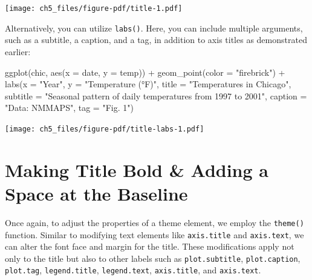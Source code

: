 \documentclass[
  letterpaper,
]{scrbook}
\newenvironment{Shaded}{\begin{snugshade}}{\end{snugshade}}
\newcommand{\AttributeTok}[1]{\textcolor[rgb]{0.40,0.45,0.13}{#1}}
\newcommand{\FunctionTok}[1]{\textcolor[rgb]{0.28,0.35,0.67}{#1}}
\newcommand{\NormalTok}[1]{\textcolor[rgb]{0.00,0.23,0.31}{#1}}
\newcommand{\SpecialCharTok}[1]{\textcolor[rgb]{0.37,0.37,0.37}{#1}}
\newcommand{\StringTok}[1]{\textcolor[rgb]{0.13,0.47,0.30}{#1}}
\begin{document}
\texttt{[image: ch5\_files/figure-pdf/title-1.pdf]}

Alternatively, you can utilize \texttt{labs()}. Here, you can include
multiple arguments, such as a subtitle, a caption, and a tag, in
addition to axis titles as demonstrated earlier:

\begin{Shaded}
\begin{Highlighting}[]
\FunctionTok{ggplot}\NormalTok{(chic, }\FunctionTok{aes}\NormalTok{(}\AttributeTok{x =}\NormalTok{ date, }\AttributeTok{y =}\NormalTok{ temp)) }\SpecialCharTok{+}
  \FunctionTok{geom\_point}\NormalTok{(}\AttributeTok{color =} \StringTok{"firebrick"}\NormalTok{) }\SpecialCharTok{+}
  \FunctionTok{labs}\NormalTok{(}\AttributeTok{x =} \StringTok{"Year"}\NormalTok{, }\AttributeTok{y =} \StringTok{"Temperature (°F)"}\NormalTok{,}
       \AttributeTok{title =} \StringTok{"Temperatures in Chicago"}\NormalTok{,}
       \AttributeTok{subtitle =} \StringTok{"Seasonal pattern of daily temperatures from 1997 to 2001"}\NormalTok{,}
       \AttributeTok{caption =} \StringTok{"Data: NMMAPS"}\NormalTok{,}
       \AttributeTok{tag =} \StringTok{"Fig. 1"}\NormalTok{)}
\end{Highlighting}
\end{Shaded}

\texttt{[image: ch5\_files/figure-pdf/title-labs-1.pdf]}

\section{Making Title Bold \& Adding a Space at the
Baseline}\label{making-title-bold-adding-a-space-at-the-baseline}

Once again, to adjust the properties of a theme element, we employ the
\texttt{theme()} function. Similar to modifying text elements like
\texttt{axis.title} and \texttt{axis.text}, we can alter the font face
and margin for the title. These modifications apply not only to the
title but also to other labels such as \texttt{plot.subtitle},
\texttt{plot.caption}, \texttt{plot.tag}, \texttt{legend.title},
\texttt{legend.text}, \texttt{axis.title}, and \texttt{axis.text}.
\end{document}
